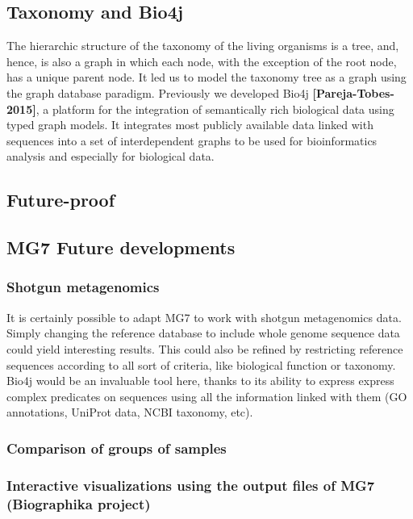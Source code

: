 \documentclass{frontiersSCNS} %
\begin{document}
\subsection{Taxonomy and Bio4j}\label{taxonomy-and-bio4j}

The hierarchic structure of the taxonomy of the living organisms is a
tree, and, hence, is also a graph in which each node, with the exception
of the root node, has a unique parent node. It led us to model the
taxonomy tree as a graph using the graph database paradigm. Previously
we developed Bio4j \textbf{{[}Pareja-Tobes-2015{]}}, a platform for the
integration of semantically rich biological data using typed graph
models. It integrates most publicly available data linked with sequences
into a set of interdependent graphs to be used for bioinformatics
analysis and especially for biological data.

\subsection{Future-proof}\label{future-proof}

\subsection{MG7 Future developments}\label{mg7-future-developments}

\subsubsection{Shotgun metagenomics}\label{shotgun-metagenomics}

It is certainly possible to adapt MG7 to work with shotgun metagenomics
data. Simply changing the reference database to include whole genome
sequence data could yield interesting results. This could also be
refined by restricting reference sequences according to all sort of
criteria, like biological function or taxonomy. Bio4j would be an
invaluable tool here, thanks to its ability to express express complex
predicates on sequences using all the information linked with them (GO
annotations, UniProt data, NCBI taxonomy, etc).

\subsubsection{Comparison of groups of
samples}\label{comparison-of-groups-of-samples}

\subsubsection{Interactive visualizations using the output files of MG7
(Biographika
project)}\label{interactive-visualizations-using-the-output-files-of-mg7-biographika-project}
\end{document}
